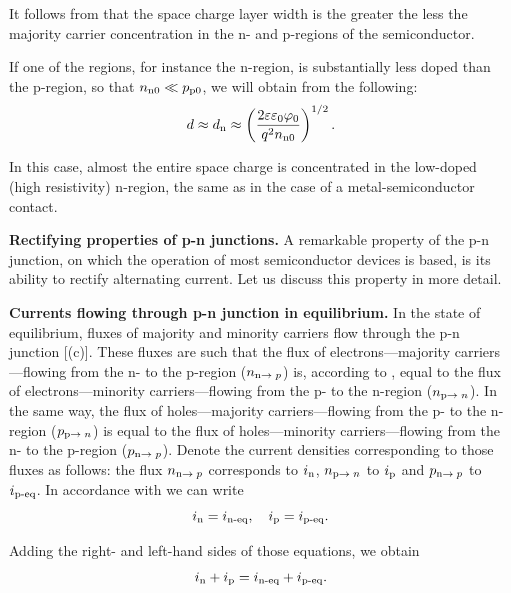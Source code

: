 \noindent
It follows from  that the space charge layer width is the greater the less the majority carrier concentration in the n- and p-regions of the semiconductor.

If one of the regions, for instance the n-region, is substantially less doped than the p-region, so that $n_{\text{n$0$}}\ll p_{\text{p$0$}}$, we will obtain from  the following:
\begin{equation}\label{eq:8_21}
	d \approx d_{\text{n}} \approx \left(\frac{2 \varepsilon \varepsilon_0 \varphi_0}{q^2 n_{\text{n$0$}}}\right)^{1/2}.
\end{equation}

In this case, almost the entire space charge is concentrated in the low-doped (high resistivity) n-region, the same as in the case of a metal-semiconductor contact.

\textbf{Rectifying properties of p-n junctions.} A remarkable property of the p-n junction, on which the operation of most semiconductor devices is based, is its ability to rectify alternating current. Let us discuss this property in more detail.

\textbf{Currents flowing through p-n junction in equilibrium.} In the state of equilibrium, fluxes of majority and minority carriers flow through the p-n junction [(c)]. These fluxes are such that the flux of electrons---majority carriers---flowing from the n- to the p-region ($n_{\text{n$\to p$}}$) is, according to , equal to the flux of electrons---minority carriers---flowing from the p- to the n-region ($n_{\text{p$\to n$}}$). In the same way, the flux of holes---majority carriers---flowing from the p- to the n-region ($p_{\text{p$\to n$}}$) is equal to the flux of holes---minority carriers---flowing from the n- to the p-region ($p_{\text{n$\to p$}}$).
Denote the current densities corresponding to those fluxes as follows: the flux $n_{\text{n$\to p$}}$ corresponds to $i_{\text{n}}$, $n_{\text{p$\to n$}}$ to $i_{\text{p}}$ and $p_{\text{n$\to p$}}$ to $i_{\text{p-eq}}$. In accordance with  we can write
\begin{equation}\label{eq:8_22}
	i_{\text{n}} = i_{\text{n-eq}},\quad i_{\text{p}} = i_{\text{p-eq}}.
\end{equation}

\noindent
Adding the right- and left-hand sides of those equations, we obtain
\begin{equation*}
	i_{\text{n}} + i_{\text{p}} = i_{\text{n-eq}} + i_{\text{p-eq}}.
\end{equation*}

